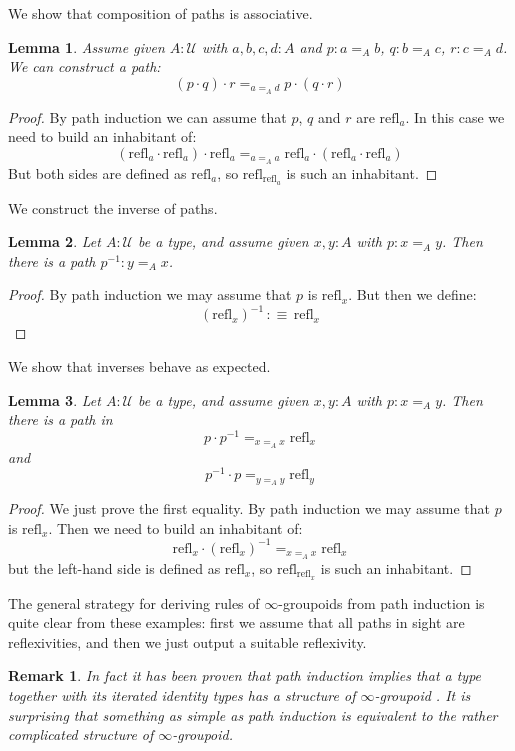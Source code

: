 \documentclass{article}
\newcommand{\U}{{\mathcal U}}
\newcommand{\refl}{\mathrm{refl}}
\newtheorem{lemma}{Lemma}
\newtheorem{remark}{Remark}
\begin{document}
We show that composition of paths is associative.

\begin{lemma}
Assume given $A:\U$ with $a,b,c,d:A$ and $p : a =_A b$, $q:b=_Ac$, $r:c=_Ad$. We can construct a path:
\[(p\cdot q)\cdot r =_{a=_Ad} p\cdot (q\cdot r)\] 
\end{lemma}
\begin{proof}
By path induction we can assume that $p$, $q$ and $r$ are $\refl_a$. In this case we need to build an inhabitant of:
\[(\refl_a\cdot \refl_a)\cdot \refl_a =_{a=_A a} \refl_a\cdot (\refl_a\cdot \refl_a)\]
But both sides are defined as $\refl_a$, so $\refl_{\refl_a}$ is such an inhabitant.
\end{proof}

We construct the inverse of paths.

\begin{lemma}
Let $A:\U$ be a type, and assume given $x,y:A$ with $p:x=_A y$. Then there is a path $p^{-1}:y=_Ax$.
\end{lemma}
\begin{proof}
By path induction we may assume that $p$ is $\refl_x$. But then we define:
\[(\refl_x)^{-1}\, :\equiv \, \refl_x\]
\end{proof}

We show that inverses behave as expected.

\begin{lemma}
Let $A:\U$ be a type, and assume given $x,y:A$ with $p:x=_A y$. Then there is a path in 
\[p\cdot p^{-1} =_{x=_A x}\refl_x \]
and 
\[p^{-1}\cdot p =_{y=_A y}\refl_y \]
\end{lemma}
\begin{proof}
We just prove the first equality. By path induction we may assume that $p$ is $\refl_x$. Then we need to build an inhabitant of:
\[\refl_x\cdot (\refl_x)^{-1} =_{x=_Ax}  \refl_x\]
but the left-hand side is defined as $\refl_x$, so $\refl_{\refl_x}$ is such an inhabitant.
\end{proof}

The general strategy for deriving rules of $\infty$-groupoids from path induction is quite clear from these examples: first we assume that all paths in sight are reflexivities, and then we just output a suitable reflexivity.


\begin{remark}
In fact it has been proven that path induction implies that a type together with its iterated identity types has a structure of $\infty$-groupoid \cite{van2011types}. %
It is surprising that something as simple as path induction is equivalent to the rather complicated structure of $\infty$-groupoid. 
\end{remark}
\end{document}
